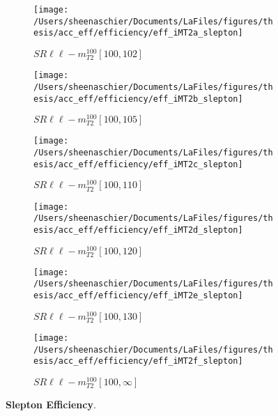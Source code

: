 \begin{figure}
        \centering
    \begin{subfigure}[b]{0.44\textwidth}
        \texttt{[image: /Users/sheenaschier/Documents/LaFiles/figures/thesis/acc\_eff/efficiency/eff\_iMT2a\_slepton]}
    \caption{$SR\ell\ell-m^{100}_{T2}[100,102]$}
    \end{subfigure}
    \begin{subfigure}[b]{0.44\textwidth}
        \texttt{[image: /Users/sheenaschier/Documents/LaFiles/figures/thesis/acc\_eff/efficiency/eff\_iMT2b\_slepton]}
    \caption{$SR\ell\ell-m^{100}_{T2}[100,105]$}
    \end{subfigure}
    \begin{subfigure}[b]{0.44\textwidth}
        \texttt{[image: /Users/sheenaschier/Documents/LaFiles/figures/thesis/acc\_eff/efficiency/eff\_iMT2c\_slepton]}
    \caption{$SR\ell\ell-m^{100}_{T2}[100,110]$}
    \end{subfigure}
    \begin{subfigure}[b]{0.44\textwidth}
        \texttt{[image: /Users/sheenaschier/Documents/LaFiles/figures/thesis/acc\_eff/efficiency/eff\_iMT2d\_slepton]}
    \caption{$SR\ell\ell-m^{100}_{T2}[100,120]$}
    \end{subfigure}
    \begin{subfigure}[b]{0.44\textwidth}
        \texttt{[image: /Users/sheenaschier/Documents/LaFiles/figures/thesis/acc\_eff/efficiency/eff\_iMT2e\_slepton]}
    \caption{$SR\ell\ell-m^{100}_{T2}[100,130]$}
    \end{subfigure}
    \begin{subfigure}[b]{0.44\textwidth}
        \texttt{[image: /Users/sheenaschier/Documents/LaFiles/figures/thesis/acc\_eff/efficiency/eff\_iMT2f\_slepton]}
    \caption{$SR\ell\ell-m^{100}_{T2}[100,\infty]$}
    \end{subfigure}
    \caption{\label{fig:slepton_efficiency}\textbf{Slepton Efficiency}.}
\end{figure}

